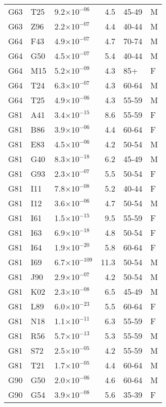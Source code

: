 \begin{longtable}{lllrll}
   G63 & T25 & 9.2$\times10^{-06}$ & 4.5 & 45-49 & M \\ 
   G63 & Z96 & 2.2$\times10^{-07}$ & 4.4 & 40-44 & M \\ 
   G64 & F43 & 4.9$\times10^{-07}$ & 4.7 & 70-74 & M \\ 
   G64 & G50 & 4.5$\times10^{-07}$ & 5.4 & 40-44 & M \\ 
   G64 & M15 & 5.2$\times10^{-09}$ & 4.3 & 85+ & F \\ 
   G64 & T24 & 6.3$\times10^{-07}$ & 4.3 & 60-64 & M \\ 
   G64 & T25 & 4.9$\times10^{-06}$ & 4.3 & 55-59 & M \\ 
   G81 & A41 & 3.4$\times10^{-15}$ & 8.6 & 55-59 & F \\ 
   G81 & B86 & 3.9$\times10^{-06}$ & 4.4 & 60-64 & F \\ 
   G81 & E83 & 4.5$\times10^{-06}$ & 4.2 & 50-54 & M \\ 
   G81 & G40 & 8.3$\times10^{-18}$ & 6.2 & 45-49 & M \\ 
   G81 & G93 & 2.3$\times10^{-07}$ & 5.5 & 50-54 & F \\ 
   G81 & I11 & 7.8$\times10^{-08}$ & 5.2 & 40-44 & F \\ 
   G81 & I12 & 3.6$\times10^{-06}$ & 4.7 & 50-54 & M \\ 
   G81 & I61 & 1.5$\times10^{-15}$ & 9.5 & 55-59 & F \\ 
   G81 & I63 & 6.9$\times10^{-18}$ & 4.8 & 50-54 & F \\ 
   G81 & I64 & 1.9$\times10^{-20}$ & 5.8 & 60-64 & F \\ 
   G81 & I69 & 6.7$\times10^{-109}$ & 11.3 & 50-54 & M \\ 
   G81 & J90 & 2.9$\times10^{-07}$ & 4.2 & 50-54 & M \\ 
   G81 & K02 & 2.3$\times10^{-08}$ & 6.5 & 45-49 & M \\ 
   G81 & L89 & 6.0$\times10^{-23}$ & 5.5 & 60-64 & F \\ 
   G81 & N18 & 1.1$\times10^{-11}$ & 6.3 & 55-59 & F \\ 
   G81 & R56 & 5.7$\times10^{-13}$ & 5.3 & 55-59 & M \\ 
   G81 & S72 & 2.5$\times10^{-05}$ & 4.2 & 55-59 & M \\ 
   G81 & T21 & 1.7$\times10^{-05}$ & 4.4 & 60-64 & M \\ 
   G90 & G50 & 2.0$\times10^{-06}$ & 4.6 & 60-64 & M \\ 
   G90 & G54 & 3.9$\times10^{-08}$ & 5.6 & 35-39 & F \\ 

\end{longtable}
